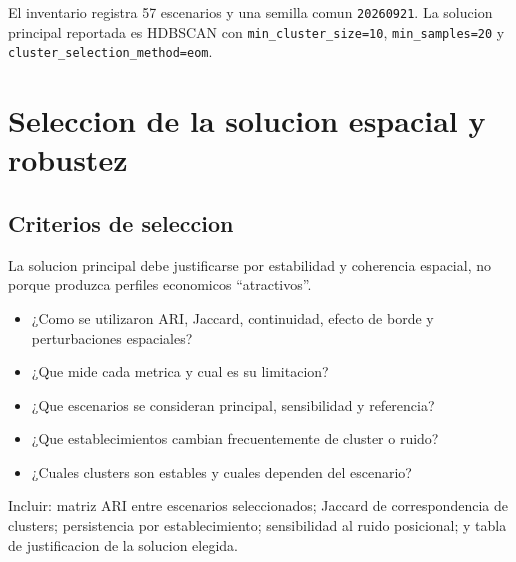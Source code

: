 \documentclass[11pt,letterpaper]{article}
\begin{document}
\begin{hechos}
El inventario registra 57 escenarios y una semilla comun \texttt{20260921}. La solucion principal reportada es HDBSCAN con \texttt{min\_cluster\_size=10}, \texttt{min\_samples=20} y \texttt{cluster\_selection\_method=eom}.
\end{hechos}

\section{Seleccion de la solucion espacial y robustez}

\subsection{Criterios de seleccion}
La solucion principal debe justificarse por estabilidad y coherencia espacial, no porque produzca perfiles economicos ``atractivos''.

\begin{preguntas}
\begin{itemize}
    \item ¿Como se utilizaron ARI, Jaccard, continuidad, efecto de borde y perturbaciones espaciales?
    \item ¿Que mide cada metrica y cual es su limitacion?
    \item ¿Que escenarios se consideran principal, sensibilidad y referencia?
    \item ¿Que establecimientos cambian frecuentemente de cluster o ruido?
    \item ¿Cuales clusters son estables y cuales dependen del escenario?
\end{itemize}
\end{preguntas}

\begin{evidencia}
Incluir: matriz ARI entre escenarios seleccionados; Jaccard de correspondencia de clusters; persistencia por establecimiento; sensibilidad al ruido posicional; y tabla de justificacion de la solucion elegida.
\end{evidencia}
\end{document}
